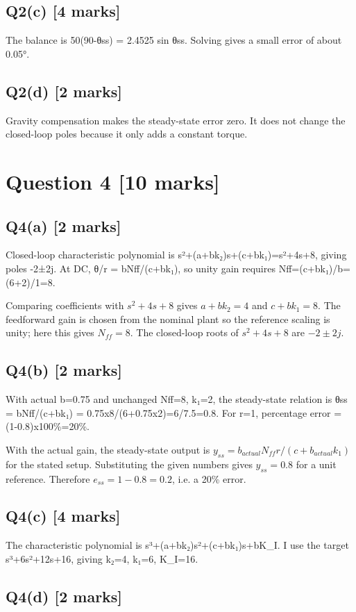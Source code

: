 \documentclass[11pt,a4paper]{article}
\begin{document}
\subsection*{Q2(c) \hfill [4 marks]}

The balance is 50(90-θss) = 2.4525 sin θss.
Solving gives a small error of about 0.05°.

\subsection*{Q2(d) \hfill [2 marks]}

Gravity compensation makes the steady-state error zero.
It does not change the closed-loop poles because it only adds a constant torque.

\section*{Question 4 \hfill [10 marks]}
\subsection*{Q4(a) \hfill [2 marks]}

Closed-loop characteristic polynomial is s²+(a+bk₂)s+(c+bk₁)=s²+4s+8, giving poles -2±2j.
At DC, θ/r = bNff/(c+bk₁), so unity gain requires Nff=(c+bk₁)/b=(6+2)/1=8.\par\smallskip Comparing coefficients with $s^2+4s+8$ gives $a+bk_2=4$ and $c+bk_1=8$. The feedforward gain is chosen from the nominal plant so the reference scaling is unity; here this gives $N_{ff}=8$. The closed-loop roots of $s^2+4s+8$ are $-2\pm2j$.

\subsection*{Q4(b) \hfill [2 marks]}

With actual b=0.75 and unchanged Nff=8, k₁=2, the steady-state relation is θss = bNff/(c+bk₁) = 0.75x8/(6+0.75x2)=6/7.5=0.8.
For r=1, percentage error = (1-0.8)x100\%=20\%.\par\smallskip With the actual gain, the steady-state output is $y_{ss}=b_{actual}N_{ff}r/ (c+b_{actual}k_1)$ for the stated setup. Substituting the given numbers gives $y_{ss}=0.8$ for a unit reference. Therefore $e_{ss}=1-0.8=0.2$, i.e. a 20\% error.

\subsection*{Q4(c) \hfill [4 marks]}

The characteristic polynomial is s³+(a+bk₂)s²+(c+bk₁)s+bK\_I.
I use the target s³+6s²+12s+16, giving k₂=4, k₁=6, K\_I=16.

\subsection*{Q4(d) \hfill [2 marks]}

\vspace{2mm}
\end{document}
